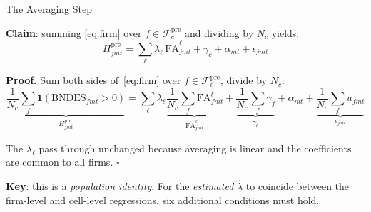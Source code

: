 \documentclass[aspectratio=169,11pt]{beamer}
\newcommand{\FA}{\mathrm{FA}}
\newcommand{\ind}{\mathbf{1}}
\newcommand{\cFpre}{\mathcal{F}^{\mathrm{pre}}}
\begin{document}
\begin{frame}{The Averaging Step}

\footnotesize
\textbf{Claim}: summing \eqref{eq:firm} over $f \in \cFpre_c$ and dividing by $N_c$ yields:
\begin{equation}\label{eq:cell}
  H^\mathrm{pre}_{jmt}
  = \sum_\ell \lambda_\ell\,\overline{\FA}^{\ell}_{jmt}
  + \bar\gamma_c + \alpha_{mt} + \epsilon_{jmt}
\end{equation}

\textbf{Proof.}\; Sum both sides of~\eqref{eq:firm} over $f \in \cFpre_c$, divide by $N_c$:
\[
  \underbrace{\frac{1}{N_c}\sum_f \ind(\text{BNDES}_{fmt}>0)}_{H^\mathrm{pre}_{jmt}}
  = \sum_\ell \lambda_\ell
    \underbrace{\frac{1}{N_c}\sum_f \FA^\ell_{fmt}}_{\overline{\FA}^{\ell}_{jmt}}
  + \underbrace{\frac{1}{N_c}\sum_f \gamma_f}_{\bar\gamma_c}
  + \alpha_{mt}
  + \underbrace{\frac{1}{N_c}\sum_f u_{fmt}}_{\epsilon_{jmt}}
\]

The $\lambda_\ell$ pass through unchanged because averaging is linear and the
coefficients are common to all firms. \hfill$\square$

\medskip
\textbf{Key}: this is a \emph{population identity}. For the \emph{estimated}
$\hat\lambda$ to coincide between the firm-level and cell-level regressions,
six additional conditions must hold.

\end{frame}
\end{document}
